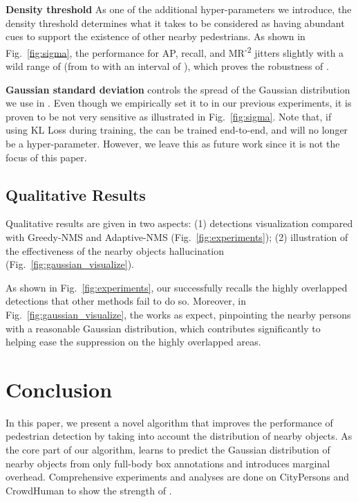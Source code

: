 \documentclass[sigconf]{acmart}
\begin{document}
\textbf{Density threshold} As one of the additional hyper-parameters we introduce, the density threshold  determines what it takes to be considered as having abundant cues to support the existence of other nearby pedestrians. As shown in Fig.~\ref{fig:sigma}, the performance for AP, recall, and MR\textsuperscript{-2} jitters slightly with a wild range of  (from  to  with an interval of ), which proves the robustness of \nmsname{}.

\textbf{Gaussian standard deviation}  controls the spread of the Gaussian distribution we use in \heatmapnameshort{}. Even though we empirically set it to  in our previous experiments, it is proven to be not very sensitive as illustrated in Fig.~\ref{fig:sigma}. Note that, if using KL Loss during training, the  can be trained end-to-end, and will no longer be a hyper-parameter. However, we leave this as future work since it is not the focus of this paper.

\subsection{Qualitative Results}
\label{sec:qualitative}
Qualitative results are given in two aspects: (1) detections visualization compared with Greedy-NMS and Adaptive-NMS (Fig.~\ref{fig:experiments}); (2) illustration of the effectiveness of the nearby objects hallucination (Fig.~\ref{fig:gaussian_visualize}).

As shown in Fig.~\ref{fig:experiments}, our \nmsname{} successfully recalls the highly overlapped detections that other methods fail to do so. Moreover, in Fig.~\ref{fig:gaussian_visualize}, the \heatmapname{} works as expect, pinpointing the nearby persons with a reasonable Gaussian distribution, which contributes significantly to helping \nmsname{} ease the suppression on the highly overlapped areas.

\section{Conclusion}


In this paper, we present a novel \nmsname{} algorithm that improves the performance of pedestrian detection by taking into account the distribution of nearby objects. As the core part of our algorithm, \heatmapname{} learns to predict the Gaussian distribution of nearby objects from only full-body box annotations and introduces marginal overhead. Comprehensive experiments and analyses are done on CityPersons \cite{citypersons} and CrowdHuman \cite{crowdhuman} to show the strength of \nmsname{}.
\end{document}
